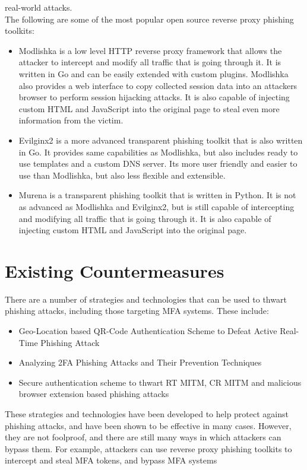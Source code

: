 \documentclass[12pt]{report}
\begin{document}
real-world attacks. \\ The following are some of the most popular open source reverse proxy phishing toolkits:
\begin{itemize}
  \item Modlishka \cite{modlishka} is a low level HTTP reverse proxy framework that allows the attacker to intercept and modify
    all traffic that is going through it. It is written in Go and can be easily extended with custom plugins. Modlishka also provides
    a web interface to copy collected session data into an attackers browser to perform session hijacking attacks.
    It is also capable of injecting custom HTML and JavaScript into the original page to steal even more information from the victim.

  \item Evilginx2 \cite{evilginx2} is a more advanced transparent phishing toolkit that is also written in Go. It provides same
    capabilities as Modlishka, but also includes ready to use templates and a custom DNS server. Its more user friendly and easier to use
    than Modlishka, but also less flexible and extensible.

  \item Murena \cite{murena} is a transparent phishing toolkit that is written in Python. It is not as advanced as Modlishka and Evilginx2,
    but is still capable of intercepting and modifying all traffic that is going through it. It is also capable of injecting custom HTML and
    JavaScript into the original page.
\end{itemize}


\section{Existing Countermeasures}
There are a number of strategies and technologies that can be used to thwart phishing
attacks, including those targeting MFA systems. These include:
\begin{itemize}
	\item Geo-Location based QR-Code Authentication Scheme to Defeat Active Real-Time
	      Phishing Attack \cite{link1}

	\item Analyzing 2FA Phishing Attacks and Their Prevention Techniques \cite{link2}

	\item Secure authentication scheme to thwart RT MITM, CR MITM and malicious
	      browser extension based phishing attacks \cite{link3}
\end{itemize}
These strategies and technologies have been developed to help protect against
phishing attacks, and have been shown to be effective in many cases. However, they
are not foolproof, and there are still many ways in which attackers can bypass
them. For example, attackers can use reverse proxy phishing toolkits to
intercept and steal MFA tokens, and bypass MFA systems
\end{document}

